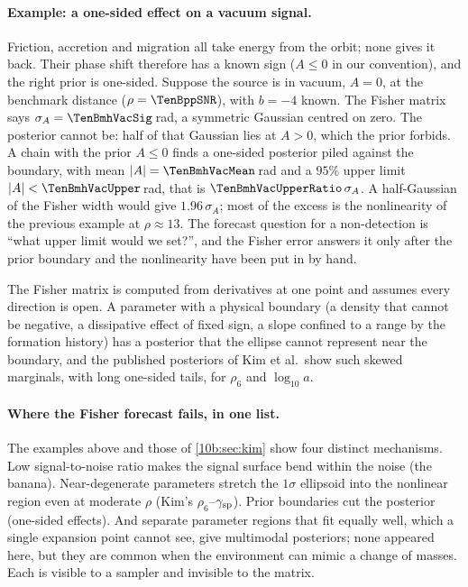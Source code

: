 \paragraph{Example: a one-sided effect on a vacuum signal.} Friction, accretion and migration all take energy from
the orbit; none gives it back. Their phase shift therefore has a known sign ($A\le0$ in our convention), and the
right prior is one-sided. Suppose the source is in vacuum, $A=0$, at the benchmark distance ($\rho=\TenBppSNR$), with
$b=-4$ known. The Fisher matrix says $\sigma_A=\TenBmhVacSig$\,rad, a symmetric Gaussian centred on zero. The posterior
cannot be: half of that Gaussian lies at $A>0$, which the prior forbids. A chain with the prior $A\le0$ finds a
one-sided posterior piled against the boundary, with mean $|A|=\TenBmhVacMean$\,rad and a $95\%$ upper limit
$|A|<\TenBmhVacUpper$\,rad, that is $\TenBmhVacUpperRatio\,\sigma_A$. A half-Gaussian of the Fisher width would give $1.96\,\sigma_A$;
most of the excess is the nonlinearity of the previous example at $\rho\approx13$. The forecast question for a non-detection is
``what upper limit would we set?'', and the Fisher error answers it only after the prior boundary and the
nonlinearity have been put in by hand.

\begin{pitfall}
The Fisher matrix is computed from derivatives at one point and assumes every direction is open. A parameter with a
physical boundary (a density that cannot be negative, a dissipative effect of fixed sign, a slope confined to a
range by the formation history) has a posterior that the ellipse cannot represent near the boundary, and the
published posteriors of Kim et al.\ show such skewed marginals, with long one-sided tails, for $\rho_6$ and $\log_{10}a$.
\end{pitfall}

\paragraph{Where the Fisher forecast fails, in one list.} The examples above and those of \cref{10b:sec:kim} show
four distinct mechanisms. Low signal-to-noise ratio makes the signal surface bend within the noise (the banana).
Near-degenerate parameters stretch the $1\sigma$ ellipsoid into the nonlinear region even at moderate $\rho$ (Kim's
$\rho_6$--$\gamma_{\rm sp}$). Prior boundaries cut the posterior (one-sided effects). And separate parameter regions that
fit equally well, which a single expansion point cannot see, give multimodal posteriors; none appeared here, but they
are common when the environment can mimic a change of masses. Each is visible to a sampler and invisible to the
matrix.

